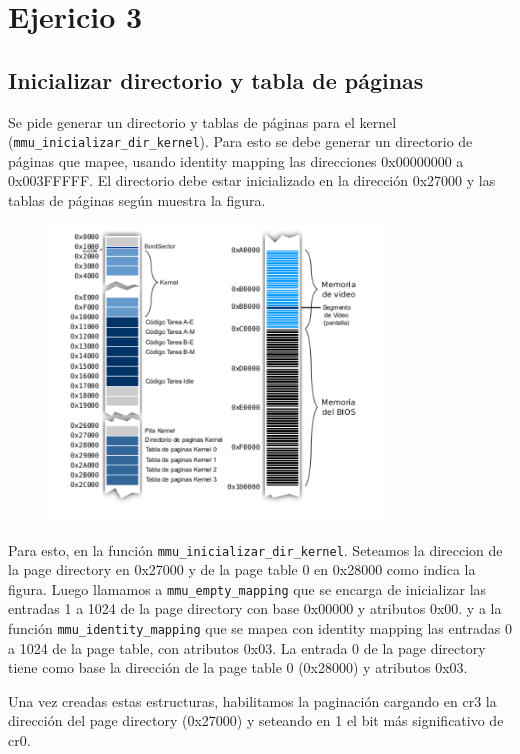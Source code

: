 \section{Ejericio 3}

\subsection{Inicializar directorio y tabla de páginas}

Se pide generar un directorio y tablas de páginas para el kernel (\texttt{mmu\_inicializar\_dir\_kernel}). Para esto se debe generar un directorio de páginas que mapee, usando identity mapping las direcciones 0x00000000 a 0x003FFFFF. El directorio debe estar inicializado en la dirección 0x27000 y las tablas de páginas según muestra la figura.

\begin{figure}[ht]
\centering
\includegraphics[width=90mm]{ej_3/img_ej_3.png}
\end{figure}

Para esto, en la función \texttt{mmu\_inicializar\_dir\_kernel}. Seteamos la direccion de la page directory en 0x27000 y de la page table 0 en 0x28000 como indica la figura.
Luego llamamos a \texttt{mmu\_empty\_mapping} que se encarga de inicializar las entradas 1 a 1024 de la page directory con base 0x00000 y atributos 0x00.
y a la función \texttt{mmu\_identity\_mapping} que se mapea con identity mapping las entradas 0 a 1024 de la page table, con atributos 0x03.
La entrada 0 de la page directory tiene como base la dirección de la page table 0 (0x28000) y atributos 0x03.

Una vez creadas estas estructuras, habilitamos la paginación cargando en cr3 la dirección del page directory (0x27000) y seteando en 1 el bit más significativo de cr0.


